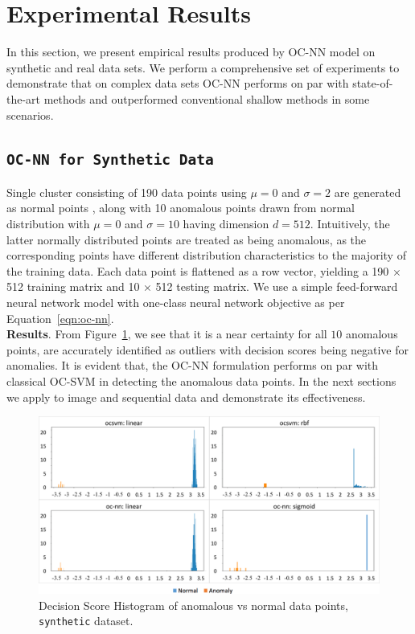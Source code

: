 \section{Experimental Results}
\label{sec:ocnn_experiment-results}

In this section, we present empirical results produced by OC-NN model on synthetic and real data sets. We perform a comprehensive set of experiments to demonstrate that on complex data sets OC-NN performs on par with state-of-the-art methods and outperformed conventional shallow methods in some scenarios.
\subsection{\tt OC-NN for Synthetic Data}
Single cluster consisting of 190 data points using $\mu=0$ and $\sigma = 2$ are generated as normal points , along with 10 anomalous points drawn from normal distribution with $\mu=0$ and $\sigma = 10$ having  dimension $d=512$. Intuitively, the latter normally distributed points are treated as being anomalous, as the corresponding points have different distribution characteristics to the majority of the training data. Each data point is flattened as a row vector, yielding a 190 $\times$ 512 training matrix and 10 $\times$ 512 testing matrix. We use a simple feed-forward neural network model with one-class neural network  objective as per Equation~\ref{eqn:oc-nn}.\\
\textbf{Results}.
From Figure~\ref{fig:synthetic-histogram}, we see that it is a near certainty for all $10$ anomalous points, are accurately identified as outliers with decision scores being negative for anomalies. It is evident that, the OC-NN formulation performs on par with classical OC-SVM in detecting the anomalous data points. In the next sections we apply to image and sequential data and demonstrate its effectiveness.


\begin{figure}
    \centering
    \includegraphics[scale=0.38]{images/s1.png}
    \caption{Decision Score Histogram of anomalous vs normal data points, {\tt synthetic} dataset.}
    \label{fig:synthetic-histogram}
\end{figure}


